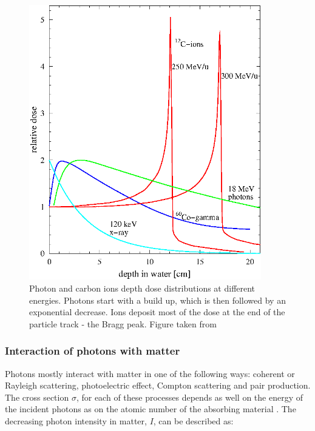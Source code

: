 \documentclass[type=dr, dr=rernat, accentcolor=tud7b,colorbacktitle, bigchapter, openright, twoside, 12pt ]{tudthesis}
\begin{document}
\begin{figure}[H]
\begin{center}
\includegraphics[width=0.9\textwidth]{./Images/depthdose.png}
\caption{Photon and carbon ions depth dose distributions at different energies. Photons start with a build up, which is then followed by an exponential decrease. Ions deposit most of the dose at the end of the particle track - the Bragg peak. Figure taken from \cite{Schardt2010} }
\label{ddp}
\end{center}
\end{figure}

\subsubsection{Interaction of photons with matter}

Photons mostly interact with matter in one of the following ways: coherent or Rayleigh scattering, photoelectric effect, Compton scattering and pair production. The cross section $\sigma$, for each of these processes depends as well on the energy of the incident photons as on the atomic number of the absorbing material \cite{Lilley2006}. The decreasing photon intensity in matter, $I$, can be described as:
\end{document}
